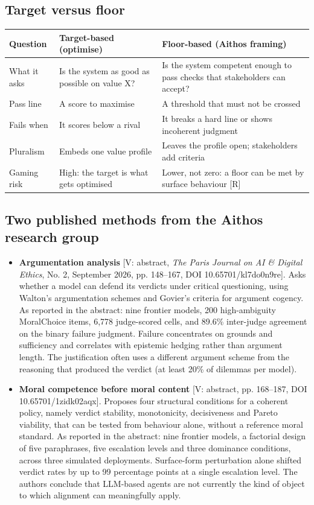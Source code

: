 \subsection{Target versus floor}
\begin{center}
\begin{tabularx}{\linewidth}{lXX}
\toprule
Question & Target-based (optimise) & Floor-based (Aithos framing) \\
\midrule
What it asks & Is the system as good as possible on value X? & Is the system competent enough to pass checks that stakeholders can accept? \\
Pass line & A score to maximise & A threshold that must not be crossed \\
Fails when & It scores below a rival & It breaks a hard line or shows incoherent judgment \\
Pluralism & Embeds one value profile & Leaves the profile open; stakeholders add criteria \\
Gaming risk & High: the target is what gets optimised & Lower, not zero: a floor can be met by surface behaviour [R] \\
\bottomrule
\end{tabularx}
\end{center}

\subsection{Two published methods from the Aithos research group}
\begin{itemize}
\item \textbf{Argumentation analysis} [V: abstract, \emph{The Paris Journal on AI \& Digital Ethics}, No. 2, September 2026, pp. 148--167, DOI 10.65701/kl7do0n9re]. Asks whether a model can defend its verdicts under critical questioning, using Walton's argumentation schemes and Govier's criteria for argument cogency. As reported in the abstract: nine frontier models, 200 high-ambiguity MoralChoice items, 6,778 judge-scored cells, and 89.6\% inter-judge agreement on the binary failure judgment. Failure concentrates on grounds and sufficiency and correlates with epistemic hedging rather than argument length. The justification often uses a different argument scheme from the reasoning that produced the verdict (at least 20\% of dilemmas per model).
\item \textbf{Moral competence before moral content} [V: abstract, pp. 168--187, DOI 10.65701/1zidk02aqx]. Proposes four structural conditions for a coherent policy, namely verdict stability, monotonicity, decisiveness and Pareto viability, that can be tested from behaviour alone, without a reference moral standard. As reported in the abstract: nine frontier models, a factorial design of five paraphrases, five escalation levels and three dominance conditions, across three simulated deployments. Surface-form perturbation alone shifted verdict rates by up to 99 percentage points at a single escalation level. The authors conclude that LLM-based agents are not currently the kind of object to which alignment can meaningfully apply.
\end{itemize}

